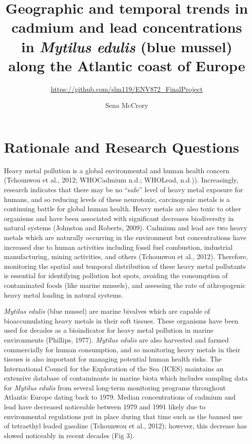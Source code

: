 \documentclass[
  12pt,
]{article}
\title{Geographic and temporal trends in cadmium and lead concentrations in
\emph{Mytilus edulis} (blue mussel) along the Atlantic coast of Europe}
\subtitle{\url{https://github.com/slm119/ENV872_FinalProject}}
\author{Sena McCrory}
\date{}
\begin{document}
\maketitle

\newpage
\tableofcontents 
\newpage
\listoftables

\listoffigures 
\newpage

\hypertarget{rationale-and-research-questions}{%
\section{Rationale and Research
Questions}\label{rationale-and-research-questions}}

Heavy metal pollution is a global environmental and human health concern
(Tchounwou et al., 2012; WHO\textbar Cadmium n.d.; WHO\textbar Lead,
n.d.)). Increasingly, research indicates that there may be no ``safe''
level of heavy metal exposure for humans, and so reducing levels of
these neurotoxic, carcinogenic metals is a continuing battle for global
human health. Heavy metals are also toxic to other organisms and have
been associated with significant decreases biodiversity in natural
systems (Johnston and Roberts, 2009). Cadmium and lead are two heavy
metals which are naturally occurring in the environment but
concentrations have increased due to human activities including fossil
fuel combustion, industrial manufacturing, mining activities, and others
(Tchounwou et al., 2012). Therefore, monitoring the spatial and temporal
distribution of these heavy metal pollutants is essential for
identifying pollution hot spots, avoiding the consumption of
contaminated foods (like marine mussels), and assessing the rate of
athropogenic heavy metal loading in natural systems.

\emph{Mytilus edulis} (blue mussel) are marine bivalves which are
capable of bioaccumulating heavy metals in their soft tissues. These
organisms have been used for decades as a bioindicator for heavy metal
pollution in marine environments (Phillips, 1977). \emph{Mytilus edulis}
are also harvested and farmed commercially for human consumption, and so
monitoring heavy metals in their tissues is also important for managing
potential human health risks. The International Council for the
Exploration of the Sea (ICES) maintains an extensive database of
contaminants in marine biota which includes sampling data for
\emph{Mytilus edulis} from several long-term monitoring programs
throughout Atlantic Europe dating back to 1979. Median concentrations of
cadmium and lead have decreased noticeable between 1979 and 1991 likely
due to environmental regulations put in place during that time such as
the banned use of tetraethyl leaded gasoline (Tchounwou et al., 2012);
however, this decrease has slowed noticeably in recent decades (Fig 3).
\end{document}
